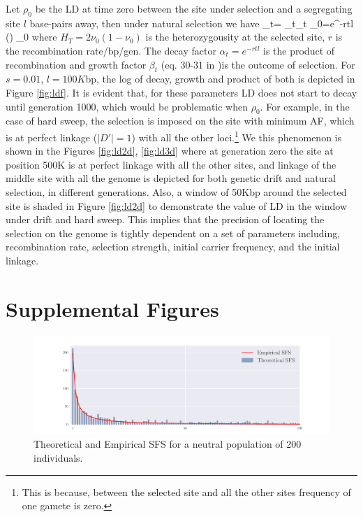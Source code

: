 \documentclass[11pt]{article}
\begin{document}
Let $\rho_0$ be the LD at time zero between the site under selection and a 
segregating site $l$ base-pairs away, then under natural selection we have
\beq
\rho_t= \alpha_t\beta_t \rho_0=e^{-rtl} \left(\right)  
\rho_0\label{eq:ldt}
\eeq
where $H_T=2\nu_0(1-\nu_0)$ is the heterozygousity at the selected site, $r$ is 
the recombination rate/bp/gen. The decay factor $\alpha_t=e^{-rtl}$ is the 
product of recombination and growth factor $\beta_t$ (eq. 30-31 in 
\cite{Stephan2006The})is the outcome of 
selection. For $s=0.01$, $l=100K$bp, the log of decay, growth and product of 
both is depicted in Figure \ref{fig:ldf}. It is evident that, for these 
parameters LD does not start to decay until generation 1000, which would be  
problematic when $\rho_0$. For example, in the case of hard sweep, the 
selection is imposed on the site with minimum AF, which is at perfect linkage 
($|D'|=1$) with all the other loci.\footnote{This is because, between the 
	selected site and all the other sites frequency of one gamete is zero.}
We this phenomenon is shown in the Figures \ref{fig:ld2d}, \ref{fig:ld3d} where 
at generation zero the site at position 500K is at perfect linkage with all the 
other sites, and linkage of the middle site with all the genome is depicted 
for both genetic drift and natural selection, in different generations.
Also, a window of 50Kbp around the selected site is shaded in Figure 
\ref{fig:ld2d} to demonstrate the value of LD in the window under drift and 
hard sweep. This implies that the precision of locating the selection on the 
genome is tightly dependent on a set of parameters including, recombination 
rate, selection strength, initial carrier frequency, and the initial linkage.

\clearpage
\newpage
\section*{Supplemental Figures}



\begin{figure}[H]
	\centering
	\includegraphics[trim=1in 0.1in 1in 0.1in,clip,width=\textwidth]{figures/sfs.pdf}
	\caption{Theoretical and Empirical SFS for a neutral population of 200 
	individuals.}	\label{fig:sfs}
\end{figure}
\end{document}
